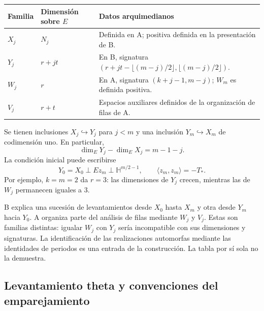 \begin{center}
\small
\begin{tabularx}{\textwidth}{@{}l l Y@{}}
\toprule
Familia & Dimensión sobre $E$ & Datos arquimedianos \\
\midrule
$X_j$ & $N_j$ & Definida en A; positiva definida en la presentación de B. \\
$Y_j$ & $r+jt$ & En B, signatura
$(r+jt-\lfloor(m-j)/2\rfloor,\lfloor(m-j)/2\rfloor)$. \\
$W_j$ & $r$ & En A, signatura $(k+j-1,m-j)$; $W_m$ es definida positiva. \\
$V_j$ & $r+t$ & Espacios auxiliares definidos de la organización de filas de A. \\
\bottomrule
\end{tabularx}
\end{center}

Se tienen inclusiones $X_j\hookrightarrow Y_j$ para $j<m$ y una
inclusión $Y_m\hookrightarrow X_m$ de codimensión uno. En particular,
\[
 \dim_EY_j-\dim_EX_j=m-1-j.
\]
La condición inicial puede escribirse
\[
 Y_0=X_0\mathbin\perp Ez_m\mathbin\perp
                  \mathbb H^{m/2-1},\qquad
 \langle z_m,z_m\rangle=-T_*.
\]
Por ejemplo, $k=m=2$ da $r=3$: las dimensiones de $Y_j$ crecen,
mientras las de $W_j$ permanecen iguales a $3$.

B explica una sucesión de levantamientos desde $X_0$ hasta $X_m$
y otra desde $Y_m$ hacia $Y_0$. A organiza parte del análisis de filas
mediante $W_j$ y $V_j$. Estas son familias distintas: igualar $W_j$
con $Y_j$ sería incompatible con sus dimensiones y signaturas.
La identificación de las realizaciones automorfas mediante las
identidades de periodos es una entrada de la construcción. La tabla
por sí sola no la demuestra.

\subsection{Levantamiento theta y convenciones del emparejamiento}


